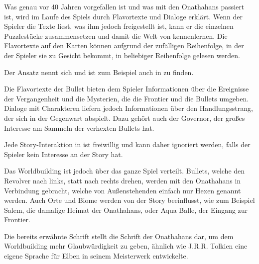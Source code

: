 Was genau vor 40 Jahren vorgefallen ist und was mit den Onathahans
passiert ist, wird im Laufe des Spiels durch Flavortexte und Dialoge erklärt. Wenn der Spieler die Texte liest,
was ihm jedoch freigestellt ist, kann er die einzelnen Puzzlestücke zusammensetzen und damit die Welt von \FF kennenlernen.
Die Flavortexte auf den Karten können aufgrund der zufälligen Reihenfolge, in der der Spieler sie zu Gesicht bekommt, in beliebiger Reihenfolge gelesen werden.


Der Ansatz nennt sich  und ist zum Beispiel auch in  zu finden.


Die Flavortexte der Bullet bieten dem Spieler Informationen über die Ereignisse der Vergangenheit und die Mysterien,
die die Frontier und die Bullets umgeben. Dialoge mit Charakteren liefern jedoch Informationen über den Handlungsstrang,
der sich in der Gegenwart abspielt. Dazu gehört auch \zB der Governor, der großes Interesse am Sammeln der verhexten Bullets hat.




Jede Story-Interaktion in \FF ist freiwillig und kann daher ignoriert werden, falls der Spieler kein Interesse an der Story hat.


Das Worldbuilding ist jedoch über das ganze Spiel verteilt. Bullets, welche den Revolver nach links, statt nach rechts drehen,
werden mit den Onathahans in Verbindung gebracht, welche von Außenstehenden einfach nur Hexen genannt werden.
Auch Orte und Biome werden von der Story beeinflusst, wie zum Beispiel Salem, die damalige Heimat der Onathahans, oder Aqua Balle,
der Eingang zur Frontier.


Die bereits erwähnte Schrift stellt die Schrift der Onathahans dar, um dem Worldbuilding mehr Glaubwürdigkeit zu geben,
ähnlich wie J.R.R. Tolkien eine eigene Sprache für Elben in seinem Meisterwerk  entwickelte. 

\renewcommand{\kapitelautor}{}
